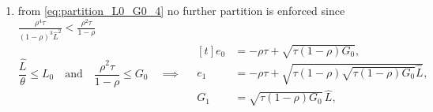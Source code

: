 \documentclass[a4paper,fleqn]{cas-sc}
\begin{document}
\begin{enumerate}
\begin{equation}
\begin{aligned}[t]
        \end{aligned}
    \end{equation}
    \item from \eqref{eq:partition_L0_G0_4} no further partition is enforced since $\frac{\rho^4\tau}{(1-\rho)^3\hat{L}^2} < \frac{\rho^2\tau}{1-\rho}$
    \begin{equation}\label{eq:sub_partition_4}
        \frac{\hat{L}}{\theta}\leq L_0\quad\text{and}\quad\frac{\rho^2\tau}{1-\rho}\leq G_0\quad\implies\quad
        \begin{aligned}[t]
            e_0 &= -\rho\tau+\sqrt{\tau(1-\rho)G_0},\\
            e_1 &= -\rho\tau+\sqrt{\tau(1-\rho)\sqrt{\tau(1-\rho)G_0}\hat{L}},\\
            G_1 &= \sqrt{\tau(1-\rho)G_0}\,\hat{L},
        \end{aligned}
    \end{equation}
\end{enumerate}
%
\end{document}
